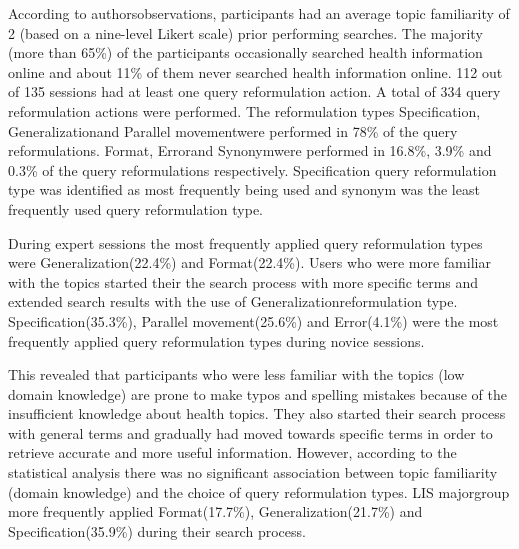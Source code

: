 \documentclass[]{article}
\begin{document}
\begin{enumerate}
According to authors\textquotesingle observations, participants had an average topic familiarity of 2 (based on a nine-level Likert scale) prior performing searches. The majority (more than 65\%) of the participants occasionally searched health information online and about 11\% of them never searched health information online. 112 out of 135 sessions had at least one query reformulation action. A total of 334 query reformulation actions were performed. The reformulation types \textquotesingle Specification\textquotesingle, \textquotesingle Generalization\textquotesingle and \textquotesingle Parallel movement\textquotesingle were performed in 78\% of the query reformulations. \textquotesingle Format\textquotesingle, \textquotesingle Error\textquotesingle and \textquotesingle Synonym\textquotesingle were performed in 16.8\%, 3.9\% and 0.3\% of the query reformulations respectively. Specification query reformulation type was identified as most frequently being used and synonym was the least frequently used query reformulation type. 

During expert sessions the most frequently applied query reformulation types were \textquotesingle Generalization\textquotesingle (22.4\%) and \textquotesingle Format\textquotesingle (22.4\%). Users who were more familiar with the topics started their the search process with more specific terms and extended search results with the use of \textquotesingle Generalization\textquotesingle reformulation type. \textquotesingle Specification\textquotesingle (35.3\%), \textquotesingle Parallel movement\textquotesingle (25.6\%) and \textquotesingle Error\textquotesingle (4.1\%) were the most frequently applied query reformulation types during novice sessions.  

This revealed that participants who were less familiar with the topics (low domain knowledge) are prone to make typos and spelling mistakes because of the insufficient knowledge about health topics. They also started their search process with general terms and gradually had moved towards specific terms in order to retrieve accurate and more useful information. However, according to the statistical analysis there was no significant association between topic familiarity (domain knowledge) and the choice of query reformulation types. \textquotesingle LIS major\textquotesingle group more frequently applied \textquotesingle Format\textquotesingle(17.7\%), \textquotesingle Generalization\textquotesingle (21.7\%) and \textquotesingle Specification\textquotesingle (35.9\%) during their search process. 


\end{enumerate}
\end{document}
